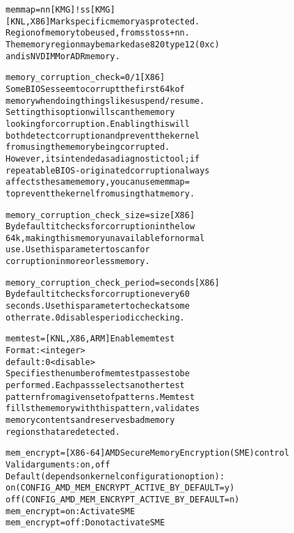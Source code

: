 \documentclass[a4paper,8pt,english]{sphinxmanual}
\begin{document}
\begin{alltt}
        memmap=nn{[}KMG{]}!ss{[}KMG{]}
                        {[}KNL,X86{]} Mark specific memory as protected.
                        Region of memory to be used, from ss to ss+nn.
                        The memory region may be marked as e820 type 12 (0xc)
                        and is NVDIMM or ADR memory.

        memory\_corruption\_check=0/1 {[}X86{]}
                        Some BIOSes seem to corrupt the first 64k of
                        memory when doing things like suspend/resume.
                        Setting this option will scan the memory
                        looking for corruption.  Enabling this will
                        both detect corruption and prevent the kernel
                        from using the memory being corrupted.
                        However, its intended as a diagnostic tool; if
                        repeatable BIOS-originated corruption always
                        affects the same memory, you can use memmap=
                        to prevent the kernel from using that memory.

        memory\_corruption\_check\_size=size {[}X86{]}
                        By default it checks for corruption in the low
                        64k, making this memory unavailable for normal
                        use.  Use this parameter to scan for
                        corruption in more or less memory.

        memory\_corruption\_check\_period=seconds {[}X86{]}
                        By default it checks for corruption every 60
                        seconds.  Use this parameter to check at some
                        other rate.  0 disables periodic checking.

        memtest=        {[}KNL,X86,ARM{]} Enable memtest
                        Format: \textless{}integer\textgreater{}
                        default : 0 \textless{}disable\textgreater{}
                        Specifies the number of memtest passes to be
                        performed. Each pass selects another test
                        pattern from a given set of patterns. Memtest
                        fills the memory with this pattern, validates
                        memory contents and reserves bad memory
                        regions that are detected.

        mem\_encrypt=    {[}X86-64{]} AMD Secure Memory Encryption (SME) control
                        Valid arguments: on, off
                        Default (depends on kernel configuration option):
                          on  (CONFIG\_AMD\_MEM\_ENCRYPT\_ACTIVE\_BY\_DEFAULT=y)
                          off (CONFIG\_AMD\_MEM\_ENCRYPT\_ACTIVE\_BY\_DEFAULT=n)
                        mem\_encrypt=on:         Activate SME
                        mem\_encrypt=off:        Do not activate SME


\end{alltt}
\end{document}
